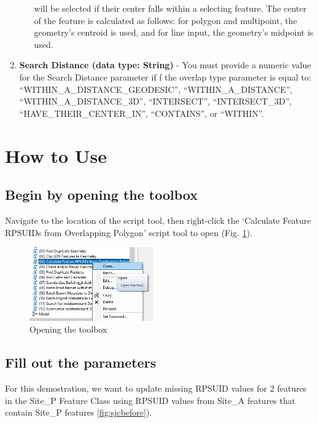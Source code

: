 \documentclass[openany]{book}
\theoremstyle{definition}
\theoremstyle{definition}
\theoremstyle{definition}
\theoremstyle{remark}
\begin{document}
\begin{enumerate}
\begin{itemize}
    will be selected if their center falls within a selecting feature.
    The center of the feature is calculated as follows: for polygon and
    multipoint, the geometry's centroid is used, and for line input, the
    geometry's midpoint is used.\\
  \end{itemize}
\item
  \textbf{Search Distance (data type: String)} - You must provide a
  numeric value for the Search Distance parameter if f the overlap type
  parameter is equal to: ``WITHIN\_A\_DISTANCE\_GEODESIC'',
  ``WITHIN\_A\_DISTANCE'', ``WITHIN\_A\_DISTANCE\_3D'', ``INTERSECT'',
  ``INTERSECT\_3D'', ``HAVE\_THEIR\_CENTER\_IN'', ``CONTAINS'', or
  ``WITHIN''.
\end{enumerate}

\section{How to Use}\label{how-to-use-3}

\subsection{Begin by opening the
toolbox}\label{begin-by-opening-the-toolbox-3}

Navigate to the location of the script tool, then right-click the
`Calculate Feature RPSUIDs from Overlapping Polygon' script tool to open
(Fig. \ref{fig:sjcopentool}).

\begin{figure}[H]

\hfill{}\includegraphics[width=2.1in,]{figures/spatjoinCalcopentool} 

\caption{Opening the toolbox}\label{fig:sjcopentool}
\end{figure}

\subsection{Fill out the parameters}\label{fill-out-the-parameters-3}

For this demostration, we want to update missing RPSUID values for 2
features in the Site\_P Feature Class using RPSUID values from Site\_A
features that contain Site\_P features \ref{fig:sjcbefore}).
\end{document}

